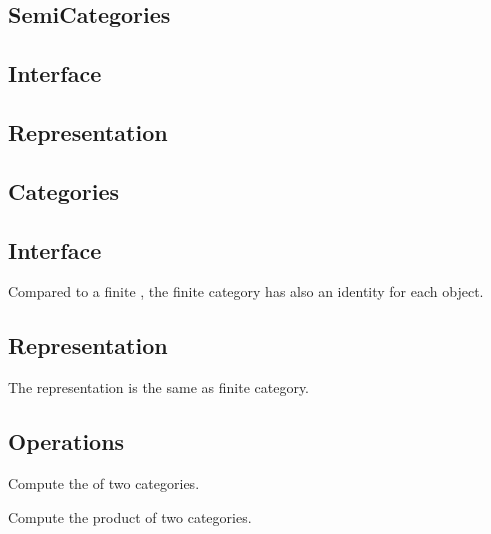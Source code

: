 
\subsection{SemiCategories}
\subsection*{Interface}

\subsection*{Representation}


\subsection{Categories}
\subsection*{Interface}
Compared to a finite , the finite category has also an identity for each object.

\subsection*{Representation}

The representation is the same as finite category.

\subsection*{Operations}

\begin{codeexercise}
    Compute the  of two categories.

\end{codeexercise}

\begin{codeexercise}
    Compute the product of two categories.

\end{codeexercise}

